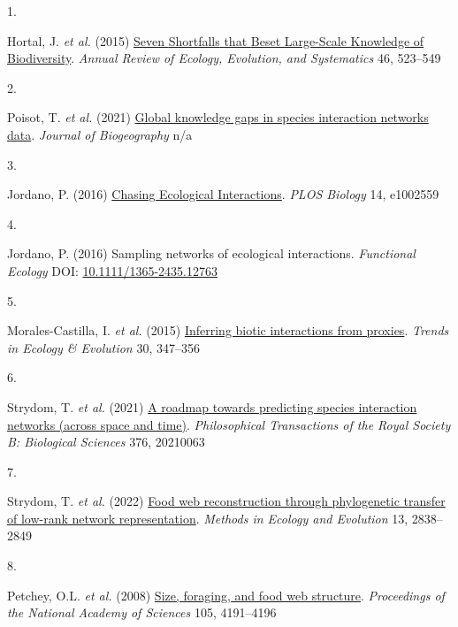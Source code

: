 \documentclass[
]{article}
\newlength{\cslhangindent}
\newlength{\csllabelwidth}
\newenvironment{CSLReferences}[2] %
 {\begin{list}{}{%
  \setlength{\itemindent}{0pt}
  \setlength{\leftmargin}{0pt}
  \setlength{\parsep}{0pt}
  \ifodd #1
   \setlength{\leftmargin}{\cslhangindent}
   \setlength{\itemindent}{-1\cslhangindent}
  \fi
  \setlength{\itemsep}{#2\baselineskip}}}
 {\end{list}}
\newcommand{\CSLLeftMargin}[1]{\parbox[t]{\csllabelwidth}{\strut#1\strut}}
\newcommand{\CSLRightInline}[1]{\parbox[t]{\linewidth - \csllabelwidth}{\strut#1\strut}}
\begin{document}
\label{refs}
\begin{CSLReferences}{0}{0}
\CSLLeftMargin{1. }%
\CSLRightInline{Hortal, J. \emph{et al.} (2015)
\href{https://doi.org/10.1146/annurev-ecolsys-112414-054400}{Seven
{Shortfalls} that {Beset Large-Scale Knowledge} of {Biodiversity}}.
\emph{Annual Review of Ecology, Evolution, and Systematics} 46,
523--549}

\CSLLeftMargin{2. }%
\CSLRightInline{Poisot, T. \emph{et al.} (2021)
\href{https://doi.org/10.1111/jbi.14127}{Global knowledge gaps in
species interaction networks data}. \emph{Journal of Biogeography} n/a}

\CSLLeftMargin{3. }%
\CSLRightInline{Jordano, P. (2016)
\href{https://doi.org/10.1371/journal.pbio.1002559}{Chasing {Ecological
Interactions}}. \emph{PLOS Biology} 14, e1002559}

\CSLLeftMargin{4. }%
\CSLRightInline{Jordano, P. (2016) Sampling networks of ecological
interactions. \emph{Functional Ecology} DOI:
\href{https://doi.org/10.1111/1365-2435.12763}{10.1111/1365-2435.12763}}

\CSLLeftMargin{5. }%
\CSLRightInline{Morales-Castilla, I. \emph{et al.} (2015)
\href{https://doi.org/10.1016/j.tree.2015.03.014}{Inferring biotic
interactions from proxies}. \emph{Trends in Ecology \& Evolution} 30,
347--356}

\CSLLeftMargin{6. }%
\CSLRightInline{Strydom, T. \emph{et al.} (2021)
\href{https://doi.org/10.1098/rstb.2021.0063}{A roadmap towards
predicting species interaction networks (across space and time)}.
\emph{Philosophical Transactions of the Royal Society B: Biological
Sciences} 376, 20210063}

\CSLLeftMargin{7. }%
\CSLRightInline{Strydom, T. \emph{et al.} (2022)
\href{https://doi.org/10.1111/2041-210X.13835}{Food web reconstruction
through phylogenetic transfer of low-rank network representation}.
\emph{Methods in Ecology and Evolution} 13, 2838--2849}

\CSLLeftMargin{8. }%
\CSLRightInline{Petchey, O.L. \emph{et al.} (2008)
\href{https://doi.org/10.1073/pnas.0710672105}{Size, foraging, and food
web structure}. \emph{Proceedings of the National Academy of Sciences}
105, 4191--4196}


\end{CSLReferences}
\end{document}
